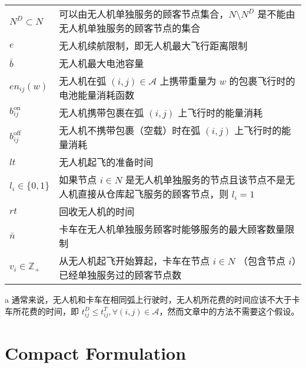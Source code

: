 \documentclass[fontset=none]{ctexart}
\begin{document}
\begin{table}[!htbp]
\begin{threeparttable}
\begin{tabularx}{\textwidth}{lX}
        $N^D \subset N$ & 可以由无人机单独服务的顾客节点集合，$N \setminus N^D$ 是不能由无人机单独服务的顾客节点的集合 \\ 
        $e$ & 无人机续航限制，即无人机最大飞行距离限制 \\ 
        $\bar{b}$ & 无人机最大电池容量 \\
        $en_{ij}(w)$ & 无人机在弧 $(i, j) \in \mathcal{A}$ 上携带重量为 $w$ 的包裹飞行时的电池能量消耗函数 \\ 
        $b_{ij}^{\text{on}}$ & 无人机携带包裹在弧 $(i, j)$ 上飞行时的能量消耗 \\
        $b_{ij}^{\text{off}}$ & 无人机不携带包裹（空载）时在弧 $(i, j)$ 上飞行时的能量消耗 \\ 
        $lt$ & 无人机起飞的准备时间 \\
        $l_i \in \{0, 1\}$ & 如果节点 $i \in N$ 是无人机单独服务的节点且该节点不是无人机直接从仓库起飞服务的顾客节点，则 $l_i = 1$ \\ 
        $rt$ & 回收无人机的时间 \\
        $\bar{n}$ & 卡车在无人机单独服务顾客时能够服务的最大顾客数量限制 \\ 
        $v_i \in \mathbb{Z}_+$ & 从无人机起飞开始算起，卡车在节点 $i \in N$ （包含节点 $i$）已经单独服务过的顾客节点数 \\
        \bottomrule[1pt] %
    \end{tabularx}
    \begin{tablenotes}
        \footnotesize %
        \item[a] \hypertarget{tab:tspd-item-1}{}通常来说，无人机和卡车在相同弧上行驶时，无人机所花费的时间应该不大于卡车所花费的时间，即 $t_{ij}^D \leq t_{ij}^T, \forall (i, j) \in \mathcal{A}$，然而文章中的方法不需要这个假设。
    \end{tablenotes}
    \end{threeparttable}
\end{table}

\section{Compact Formulation}
\end{document}
